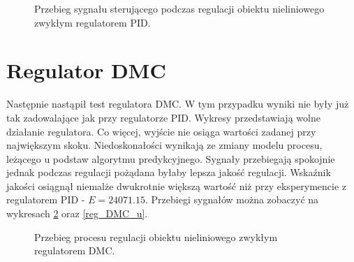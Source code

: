 \begin{figure}[b]
    \centering
    \caption{Przebieg sygnału sterującego podczas regulacji obiektu nieliniowego zwykłym regulatorem PID.}
    \label{reg_PID_u}
\end{figure}

\section{Regulator DMC}
Następnie nastąpił test regulatora DMC. 
W tym przypadku wyniki nie były już tak zadowalające jak przy regulatorze PID. 
Wykresy przedstawiają wolne działanie regulatora. 
Co więcej, wyjście nie osiąga wartości zadanej przy największym skoku. Niedoskonałości wynikają
ze zmiany modelu procesu, leżącego u podstaw algorytmu predykcyjnego.
Sygnały przebiegają spokojnie jednak podczas regulacji pożądana byłaby lepsza jakość regulacji. 
Wskaźnik jakości osiągnął niemalże dwukrotnie większą wartość niż przy eksperymencie z regulatorem 
PID - $E = \num{24071.15}$. 
Przebiegi sygnałów można zobaczyć na wykresach \ref{reg_DMC} oraz \ref{reg_DMC_u}. 

\begin{figure}[t]
    \centering
    \caption{Przebieg procesu regulacji obiektu nieliniowego zwykłym regulatorem DMC.}
    \label{reg_DMC}
\end{figure}

